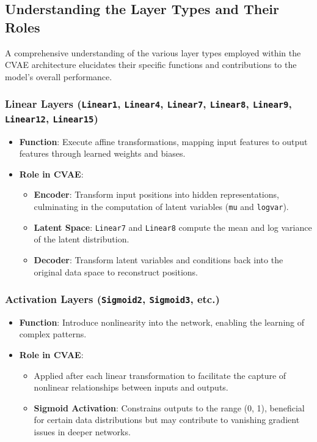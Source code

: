 \documentclass[10pt]{article}
\begin{document}
\subsection{Understanding the Layer Types and Their Roles}

A comprehensive understanding of the various layer types employed within the CVAE architecture elucidates their specific functions and contributions to the model's overall performance.

\subsubsection{Linear Layers (\texttt{Linear1}, \texttt{Linear4}, \texttt{Linear7}, \texttt{Linear8}, \texttt{Linear9}, \texttt{Linear12}, \texttt{Linear15})}

\begin{itemize}
    \item \textbf{Function}: Execute affine transformations, mapping input features to output features through learned weights and biases.
    \item \textbf{Role in CVAE}:
    \begin{itemize}
        \item \textbf{Encoder}: Transform input positions into hidden representations, culminating in the computation of latent variables (\texttt{mu} and \texttt{logvar}).
        \item \textbf{Latent Space}: \texttt{Linear7} and \texttt{Linear8} compute the mean and log variance of the latent distribution.
        \item \textbf{Decoder}: Transform latent variables and conditions back into the original data space to reconstruct positions.
    \end{itemize}
\end{itemize}

\subsubsection{Activation Layers (\texttt{Sigmoid2}, \texttt{Sigmoid3}, etc.)}

\begin{itemize}
    \item \textbf{Function}: Introduce nonlinearity into the network, enabling the learning of complex patterns.
    \item \textbf{Role in CVAE}:
    \begin{itemize}
        \item Applied after each linear transformation to facilitate the capture of nonlinear relationships between inputs and outputs.
        \item \textbf{Sigmoid Activation}: Constrains outputs to the range (0, 1), beneficial for certain data distributions but may contribute to vanishing gradient issues in deeper networks.
    \end{itemize}
\end{itemize}
\end{document}
